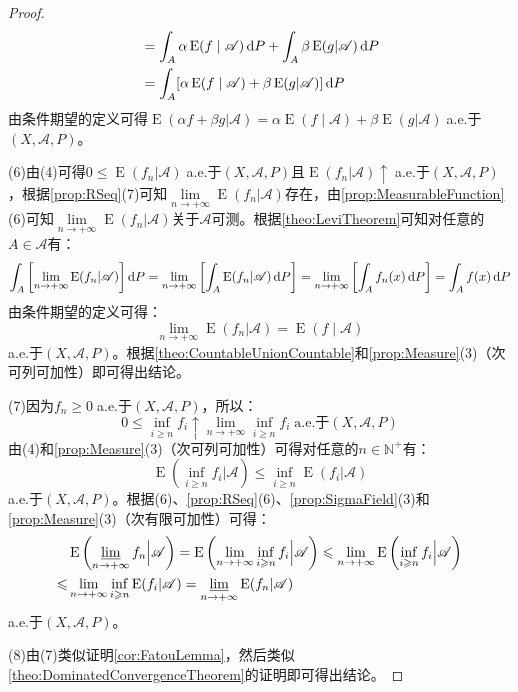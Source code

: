 \begin{proof}
\begin{align*}
		&=\int_{A}\alpha\operatorname{E}(f\mid\mathscr{A})\mathop{}\!\mathrm{d} P+\int_{A}\beta\operatorname{E}(g|\mathscr{A})\mathop{}\!\mathrm{d} P \\
		&=\int_{A}[\alpha\operatorname{E}(f\mid\mathscr{A})+\beta\operatorname{E}(g|\mathscr{A})]\mathop{}\!\mathrm{d} P
	\end{align*}
	由条件期望的定义可得$\operatorname{E}(\alpha f+\beta g|\mathscr{A})=\alpha\operatorname{E}(f\mid\mathscr{A})+\beta\operatorname{E}(g|\mathscr{A})\;$a.e.于$(X,\mathscr{A},P)$。\par
	(6)由(4)可得$0\leqslant\operatorname{E}(f_n|\mathscr{A})\;$a.e.于$(X,\mathscr{A},P)$且$\operatorname{E}(f_n|\mathscr{A})\uparrow\;$a.e.于$(X,\mathscr{A},P)$，根据\cref{prop:RSeq}(7)可知$\lim\limits_{n\to+\infty}\operatorname{E}(f_n|\mathscr{A})$存在，由\cref{prop:MeasurableFunction}(6)可知$\lim\limits_{n\to+\infty}\operatorname{E}(f_n|\mathscr{A})$关于$\mathscr{A}$可测。根据\cref{theo:LeviTheorem}可知对任意的$A\in\mathscr{A}$有：
	\begin{equation*}
		\int_{A}\left[\lim_{n\to+\infty}\operatorname{E}(f_n|\mathscr{A})\right]\mathop{}\!\mathrm{d} P=\lim_{n\to+\infty}\left[\int_{A}\operatorname{E}(f_n|\mathscr{A})\mathop{}\!\mathrm{d} P\right]=\lim_{n\to+\infty}\left[\int_{A}f_n(x)\mathop{}\!\mathrm{d} P\right]=\int_{A}f(x)\mathop{}\!\mathrm{d} P
	\end{equation*}
	由条件期望的定义可得：
	\begin{equation*}
		\lim_{n\to+\infty}\operatorname{E}(f_n|\mathscr{A})=\operatorname{E}(f\mid\mathscr{A})
	\end{equation*}
	a.e.于$(X,\mathscr{A},P)$。根据\cref{theo:CountableUnionCountable}和\cref{prop:Measure}(3)（次可列可加性）即可得出结论。\par
	(7)因为$f_n\geqslant0\;$a.e.于$(X,\mathscr{A},P)$，所以：
	\begin{equation*}
		0\leqslant\inf_{i\geqslant n}f_i\uparrow\lim_{n\to+\infty}\inf\limits_{i\geqslant n}f_i\;\text{a.e.于}(X,\mathscr{A},P)
	\end{equation*}
	由(4)和\cref{prop:Measure}(3)（次可列可加性）可得对任意的$n\in\mathbb{N}^+$有：
	\begin{equation*}
		\operatorname{E}\left(\inf_{i\geqslant n}f_i\Big|\mathscr{A}\right)\leqslant\inf_{i\geqslant n}\operatorname{E}(f_i|\mathscr{A})
	\end{equation*}
	a.e.于$(X,\mathscr{A},P)$。根据(6)、\cref{prop:RSeq}(6)、\cref{prop:SigmaField}(3)和\cref{prop:Measure}(3)（次有限可加性）可得：
	\begin{align*}
		&\operatorname{E}\left(\varliminf_{n\to+\infty}f_n\Big|\mathscr{A}\right)=\operatorname{E}\left(\lim_{n\to+\infty}\inf_{i\geqslant n}f_i\Big|\mathscr{A}\right)\leqslant\lim_{n\to+\infty}\operatorname{E}\left(\inf_{i\geqslant n}f_i\Big|\mathscr{A}\right) \\
		\leqslant&\lim_{n\to+\infty}\inf_{i\geqslant n}\operatorname{E}(f_i|\mathscr{A})=\varliminf_{n\to+\infty}\operatorname{E}(f_n|\mathscr{A})
	\end{align*}
	a.e.于$(X,\mathscr{A},P)$。\par
	(8)由(7)类似证明\cref{cor:FatouLemma}，然后类似\cref{theo:DominatedConvergenceTheorem}的证明即可得出结论。
\end{proof}
